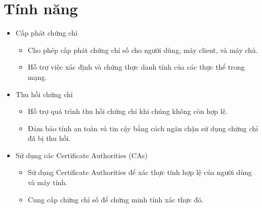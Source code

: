 \documentclass[13pt]{report}
\begin{document}
	\section{Tính năng}
	\begin{itemize}
		\item Cấp phát chứng chỉ
		\begin{itemize}
			\item Cho phép cấp phát chứng chỉ số cho người dùng, máy client, và máy chủ.		
			\item Hỗ trợ việc xác định và chứng thực danh tính của các thực thể trong mạng.
		\end{itemize}	
		\item Thu hồi chứng chỉ
		\begin{itemize}
			\item Hỗ trợ quá trình thu hồi chứng chỉ khi chúng không còn hợp lệ.
			\item Đảm bảo tính an toàn và tin cậy bằng cách ngăn chặn sử dụng chứng chỉ đã bị thu hồi.
		\end{itemize}	
		\item Sử dụng các Certificate Authorities (CAs)
		\begin{itemize}
			\item Sử dụng Certificate Authorities để xác thực tính hợp lệ của người dùng và máy tính.
			\item Cung cấp chứng chỉ số để chứng minh tính xác thực đó.
		\end{itemize}	
	\end{itemize}
\end{document}
